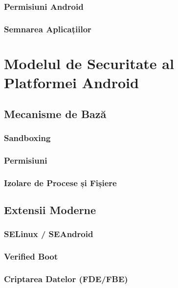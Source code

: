 \documentclass[11pt,a4paper,twocolumn]{article}
\theoremstyle{definition}
\theoremstyle{plain}
\theoremstyle{remark}
\begin{document}
\subsubsection{Permisiuni Android}

\subsubsection{Semnarea Aplicațiilor}

\section{Modelul de Securitate al Platformei Android}

\subsection{Mecanisme de Bază}

\subsubsection{Sandboxing}

\subsubsection{Permisiuni}

\subsubsection{Izolare de Procese și Fișiere}

\subsection{Extensii Moderne}

\subsubsection{SELinux / SEAndroid}

\subsubsection{Verified Boot}

\subsubsection{Criptarea Datelor (FDE/FBE)}
\end{document}

